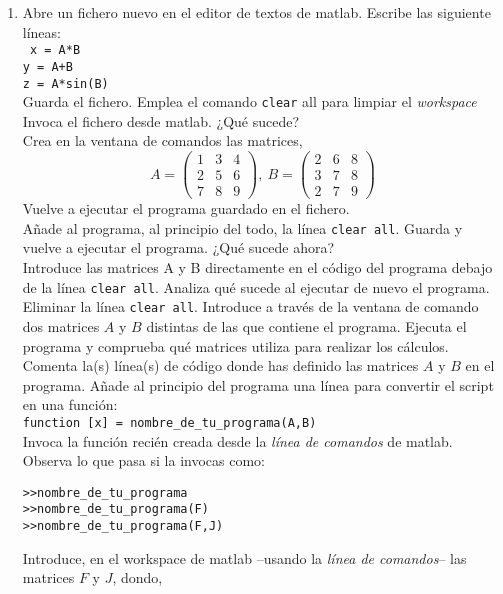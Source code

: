 \begin{enumerate}
\item Abre un fichero nuevo en el editor de textos de matlab.
Escribe las siguiente líneas:\\
\texttt{
x = A*B\\
y = A+B\\
z = A*sin(B)}\\
Guarda el fichero. Emplea el comando \verb|clear| all para limpiar el \emph{workspace}
Invoca el fichero desde matlab. ¿Qué sucede?\\
Crea en la ventana de comandos las matrices,
\begin{equation*}
A =\begin{pmatrix}
1&3&4\\
2&5&6\\
7&8&9
\end{pmatrix}, \ B=\begin{pmatrix}
2&6&8\\
3&7&8\\
2&7&9
\end{pmatrix}
\end{equation*}
Vuelve a ejecutar el programa guardado en el fichero.\\
Añade al programa, al principio del todo, la línea \texttt{clear all}. Guarda y vuelve a ejecutar el
programa. ¿Qué sucede ahora?\\
Introduce las matrices A y B directamente en el código del programa debajo de la línea \texttt{clear all}. Analiza qué sucede al ejecutar de nuevo el programa.\\
 Eliminar la línea \texttt{clear all}. Introduce a través de la ventana de comando dos matrices $A$ y $B$ distintas de las que contiene el programa. Ejecuta el programa y comprueba qué matrices utiliza para realizar los cálculos.\\
Comenta la(s) línea(s) de código donde has definido las matrices $A$ y $B$ en el programa. Añade al principio del programa una línea para convertir el script en una función:\\
\verb|function [x] = nombre_de_tu_programa(A,B)| \\
Invoca la función recién creada desde la \emph{línea de comandos} de matlab. Observa lo que pasa si la invocas como:
\begin{verbatim}
>>nombre_de_tu_programa
>>nombre_de_tu_programa(F)
>>nombre_de_tu_programa(F,J)
\end{verbatim}
Introduce, en el  workspace de matlab --usando la \emph{línea de comandos}--  las matrices $F$ y $J$, dondo,
\begin{equation*}

\end{equation*}
\end{enumerate}
